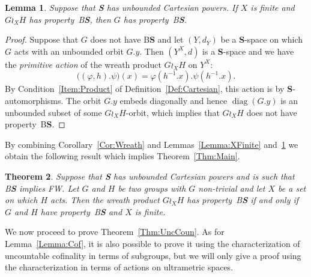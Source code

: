 \documentclass[a4paper]{article}
\newtheorem{lem}{Lemma}[section]
\newtheorem{thm}[lem]{Theorem}
\theoremstyle{definition}
\DeclareMathOperator\diag{diag}
\newcommand*{\category}[1]{\textbf{#1}}
\newcommand*{\CatS}{\category{S}}
\newcommand*{\BS}{B\textbf{S}}
\newcommand*{\FW}{FW}
\begin{document}
%
%
\begin{lem}\label{Lemma:Unboundedness}
Suppose that \CatS{} has unbounded Cartesian powers. If $X$ is finite and $G\wr_XH$ has property~\BS, then $G$ has property~\BS.
\end{lem}
\begin{proof}
Suppose that $G$ does not have \BS{} and let $(Y,d_Y)$ be a \CatS-space on which $G$ acts with an unbounded orbit $G.y$.
Then $(Y^X,d)$ is a \CatS-space and we have the \emph{primitive action} of the wreath product $G\wr_XH$ on $Y^X$:
\[
	\bigl((\varphi,h).\psi\bigr)(x)=\varphi(h^{-1}.x).\psi(h^{-1}.x).
\]
By Condition~\ref{Item:Product} of Definition~\ref{Def:Cartesian}, this action is by \CatS-automorphisms.
The orbit $G.y$ embeds diagonally and hence $\diag(G.y)$ is an unbounded subset of some $G\wr_XH$-orbit, which implies that $G\wr_XH$ does not have property~\BS.
\end{proof}
%
%
By combining Corollary~\ref{Cor:Wreath} and Lemmas~\ref{Lemma:XFinite} and~\ref{Lemma:Unboundedness} we obtain the following result which implies Theorem~\ref{Thm:Main}.
%
%
\begin{thm}\label{Thm:Technic}
Suppose that \CatS{} has unbounded Cartesian powers and is such that \BS{} implies \FW.
Let $G$ and $H$ be two groups with $G$ non-trivial and let $X$ be a set on which $H$ acts. Then the wreath product $G \wr_X H$ has property~\BS{} if and only if $G$ and $H$ have property~\BS{} and $X$ is finite.
\end{thm}
%
%
We now proceed to prove Theorem~\ref{Thm:UncCoun}.
As for Lemma~\ref{Lemma:Cof}, it is also possible to prove it using the characterization of uncountable cofinality in terms of subgroups, but we will only give a proof using the characterization in terms of actions on ultrametric spaces.
%
%
\end{document}
